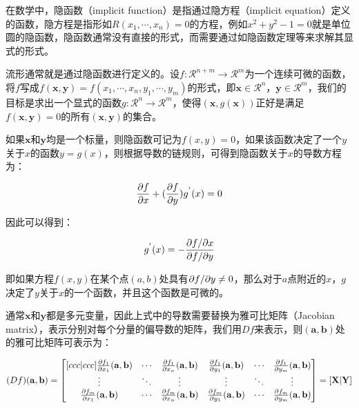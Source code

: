 在数学中，隐函数（implicit function）是指通过隐方程（implicit equation）定义的函数，隐方程是指形如$R(x_1,\cdots,x_n)=0$的方程，例如$x^{2}+y^{2}-1=0$就是单位圆的隐函数，隐函数通常没有直接的形式，而需要通过如隐函数定理等来求解其显式的形式。

流形通常就是通过隐函数进行定义的。设$f:\mathcal{R}^{n+m}\to \mathcal{R}^{m}$为一个连续可微的函数，将$f$写成$f(\mathbf{x},\mathbf{y})=f(x_1,\cdots,x_n,y_1,\cdots,y_m)$的形式，即$\mathbf{x}\in\mathcal{R}^{n}$，$\mathbf{y}\in\mathcal{R}^{m}$，我们的目标是求出一个显式的函数$g:\mathcal{R}^{n}\to\mathcal{R}^{m}$，使得$(\mathbf{x},g(\mathbf{x}))$正好是满足$f(\mathbf{x},\mathbf{y})=0$的所有$(\mathbf{x},\mathbf{y})$的集合。

如果$\mathbf{x}$和$\mathbf{y}$均是一个标量，则隐函数可记为$f(x,y)=0$，如果该函数决定了一个$y$关于$x$的函数$y=g(x)$，则根据导数的链规则，可得到隐函数关于$x$的导数方程为：

\begin{equation}
	\frac{{\rm \partial} f}{{\rm \partial} x}+(\frac{{\rm \partial} f}{{\rm \partial} y})g^{'}(x)=0
\end{equation}

\noindent 因此可以得到：

\begin{equation}\label{e:mlt-explicit-function}
	g^{'}(x)=-\frac{{\rm \partial} f/{\rm \partial} x}{{\rm \partial} f/{\rm \partial} y}
\end{equation}

即如果方程$f(x,y)$在某个点$(a,b)$处具有${\rm \partial} f/{\rm \partial} y\neq 0$，那么对于$a$点附近的$x$，$g$决定了$y$关于$x$的一个函数，并且这个函数是可微的。

通常$\mathbf{x}$和$\mathbf{y}$都是多元变量，因此上式中的导数需要替换为雅可比矩阵（Jacobian matrix），表示分别对每个分量的偏导数的矩阵，我们用$Df$来表示，则$(\mathbf{a},\mathbf{b})$处的雅可比矩阵可表示为：

\begin{equation}\label{e:mlt-jacobian}
	(Df)(\mathbf{a},\mathbf{b})=\begin{bmatrix}[ccc|ccc]
		\frac{{\rm \partial} f_1}{{\rm \partial} x_1}(\mathbf{a},\mathbf{b})&\cdots &\frac{{\rm \partial} f_1}{{\rm \partial} x_n}(\mathbf{a},\mathbf{b}) &\frac{{\rm \partial} f_1}{{\rm \partial} y_1}(\mathbf{a},\mathbf{b})&\cdots &\frac{{\rm \partial} f_1}{{\rm \partial} y_m}(\mathbf{a},\mathbf{b})\\
		\vdots & \ddots & \vdots & \vdots & \ddots & \vdots \\
		\frac{{\rm \partial} f_m}{{\rm \partial} x_1}(\mathbf{a},\mathbf{b})&\cdots & \frac{{\rm \partial} f_m}{{\rm \partial} x_n}(\mathbf{a},\mathbf{b}) &\frac{{\rm \partial} f_m}{{\rm \partial} y_1}(\mathbf{a},\mathbf{b})&\cdots & \frac{{\rm \partial} f_m}{{\rm \partial} y_m}(\mathbf{a},\mathbf{b})
	\end{bmatrix}=[\mathbf{X}|\mathbf{Y}]
\end{equation}

